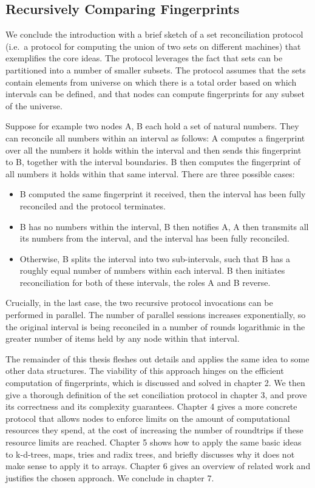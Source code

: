 \documentclass{article}
\begin{document}
\subsection{Recursively Comparing
Fingerprints}\label{recursively-comparing-fingerprints}

We conclude the introduction with a brief sketch of a set reconciliation
protocol (i.e.~a protocol for computing the union of two sets on
different machines) that exemplifies the core ideas. The protocol
leverages the fact that sets can be partitioned into a number of smaller
subsets. The protocol assumes that the sets contain elements from
universe on which there is a total order based on which intervals can be
defined, and that nodes can compute fingerprints for any subset of the
universe.

Suppose for example two nodes A, B each hold a set of natural numbers.
They can reconcile all numbers within an interval as follows: A computes
a fingerprint over all the numbers it holds within the interval and then sends this
fingerprint to B, together with the interval boundaries. B then computes
the fingerprint of all numbers it holds within that same interval. There
are three possible cases:

\begin{itemize}
\item
  B computed the same fingerprint it received, then the interval has
  been fully reconciled and the protocol terminates.
\item
  B has no numbers within the interval, B then notifies A, A then
  transmits all its numbers from the interval, and the interval has been
  fully reconciled.
\item
  Otherwise, B splits the interval into two sub-intervals, such that B
  has a roughly equal number of numbers within each interval. B then
  initiates reconciliation for both of these intervals, the roles A and
  B reverse.
\end{itemize}

Crucially, in the last case, the two recursive protocol invocations can
be performed in parallel. The number of parallel sessions increases
exponentially, so the original interval is being reconciled in a number
of rounds logarithmic in the greater number of items held by any node
within that interval.

The remainder of this thesis fleshes out details and applies the same
idea to some other data structures. The viability of this approach
hinges on the efficient computation of fingerprints, which is discussed
and solved in chapter 2. We then give a thorough definition of the set
conciliation protocol in chapter 3, and prove its correctness and its
complexity guarantees. Chapter 4 gives a more concrete protocol that
allows nodes to enforce limits on the amount of computational resources
they spend, at the cost of increasing the number of roundtrips if these
resource limits are reached. Chapter 5 shows how to apply the same basic
ideas to k-d-trees, maps, tries and radix trees, and briefly discusses
why it does not make sense to apply it to arrays. Chapter 6
gives an overview of related work and justifies the chosen approach. We
conclude in chapter 7.
\end{document}
